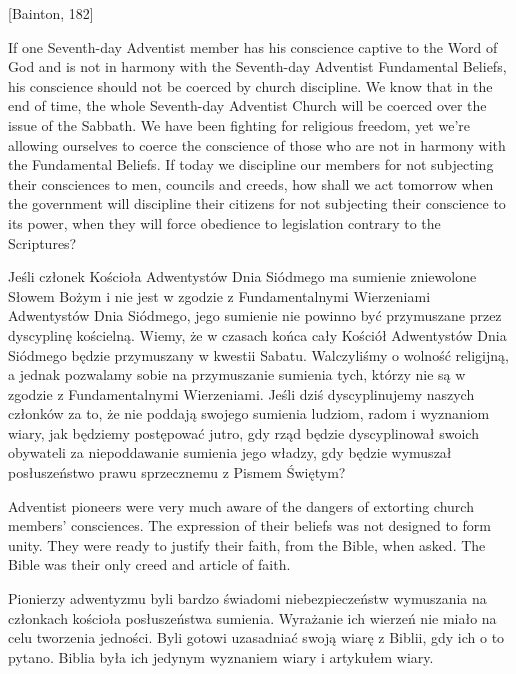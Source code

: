 [Bainton, 182]


If one Seventh-day Adventist member has his conscience captive to the Word of God and is not in harmony with the Seventh-day Adventist Fundamental Beliefs, his conscience should not be coerced by church discipline. We know that in the end of time, the whole Seventh-day Adventist Church will be coerced over the issue of the Sabbath. We have been fighting for religious freedom, yet we’re allowing ourselves to coerce the conscience of those who are not in harmony with the Fundamental Beliefs. If today we discipline our members for not subjecting their consciences to men, councils and creeds, how shall we act tomorrow when the government will discipline their citizens for not subjecting their conscience to its power, when they will force obedience to legislation contrary to the Scriptures?


Jeśli członek Kościoła Adwentystów Dnia Siódmego ma sumienie zniewolone Słowem Bożym i nie jest w zgodzie z Fundamentalnymi Wierzeniami Adwentystów Dnia Siódmego, jego sumienie nie powinno być przymuszane przez dyscyplinę kościelną. Wiemy, że w czasach końca cały Kościół Adwentystów Dnia Siódmego będzie przymuszany w kwestii Sabatu. Walczyliśmy o wolność religijną, a jednak pozwalamy sobie na przymuszanie sumienia tych, którzy nie są w zgodzie z Fundamentalnymi Wierzeniami. Jeśli dziś dyscyplinujemy naszych członków za to, że nie poddają swojego sumienia ludziom, radom i wyznaniom wiary, jak będziemy postępować jutro, gdy rząd będzie dyscyplinował swoich obywateli za niepoddawanie sumienia jego władzy, gdy będzie wymuszał posłuszeństwo prawu sprzecznemu z Pismem Świętym?


Adventist pioneers were very much aware of the dangers of extorting church members’ consciences. The expression of their beliefs was not designed to form unity. They were ready to justify their faith, from the Bible, when asked. The Bible was their only creed and article of faith.


Pionierzy adwentyzmu byli bardzo świadomi niebezpieczeństw wymuszania na członkach kościoła posłuszeństwa sumienia. Wyrażanie ich wierzeń nie miało na celu tworzenia jedności. Byli gotowi uzasadniać swoją wiarę z Biblii, gdy ich o to pytano. Biblia była ich jedynym wyznaniem wiary i artykułem wiary.


